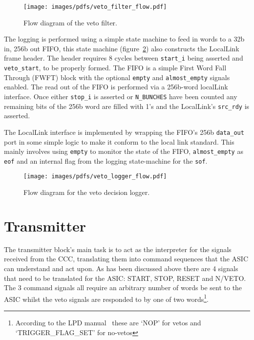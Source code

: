 \documentclass[]{report}
\begin{document}
    \begin{figure}[htbp]
        \centering
            \texttt{[image: images/pdfs/veto\_filter\_flow.pdf]}
        \caption{Flow diagram of the veto filter.}
        \label{fig:veto_filter_flow}
    \end{figure}
    
    The logging is performed using a simple state machine to feed in words to a 32b in, 256b out FIFO, this state machine (figure~\ref{fig:veto_logger_flow}) also constructs the LocalLink frame header. The header requires 8 cycles between \texttt{start\_i} being asserted and \texttt{veto\_start}, to be properly formed. The FIFO is a simple First Word Fall Through (FWFT) block with the optional \texttt{empty} and \texttt{almost\_empty} signals enabled. The read out of the FIFO is performed via a 256b-word localLink interface. Once either \texttt{stop\_i} is asserted or \texttt{N\_BUNCHES} have been counted any remaining bits of the 256b word are filled with 1's and the LocalLink's \texttt{src\_rdy} is asserted. 
    
    The LocalLink interface is implemented by wrapping the FIFO's 256b \texttt{data\_out} port in some simple logic to make it conform to the local link standard. This mainly involves using \texttt{empty} to monitor the state of the FIFO, \texttt{almost\_empty} as \texttt{eof} and an internal flag from the logging state-machine for the \texttt{sof}.
    
    
    \begin{figure}[htbp]
        \centering
            \texttt{[image: images/pdfs/veto\_logger\_flow.pdf]}
        \caption{Flow diagram for the veto decision logger.}
        \label{fig:veto_logger_flow}
    \end{figure}

    \chapter{Transmitter} %
    \label{sec:transmitter}
    The transmitter block's main task is to act as the interpreter for the signals received from the CCC, translating them into command sequences that the ASIC can understand and act upon. As has been discussed above there are 4 signals that need to be translated for the ASIC: START, STOP, RESET and N/VETO. The 3 command signals all require an arbitrary number of words be sent to the ASIC whilst the veto signals are responded to by one of two words\footnote{According to the LPD manual~\cite{LPD MANUAL} these are `NOP' for vetos and `TRIGGER\_FLAG\_SET' for no-vetos}.
    
\end{document}
